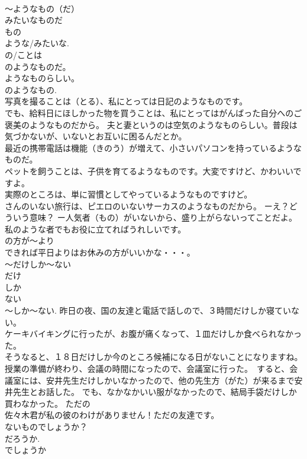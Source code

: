 \documentclass[8pt]{extreport}
\begin{document}
\begin{CJK}{UTF8}{min}
\\	～ようなもの（だ）	
\\	みたいなものだ 
\\	もの 
\\	ような/みたいな. 
\\	の/ことは
\\	のようなものだ。 
\\	ようなものらしい。 
\\	のようなもの. 
\\	写真を撮ることは（とる）、私にとっては日記のようなものです。 
\\	でも、給料日にほしかった物を買うことは、私にとってはがんばった自分へのご褒美のようなものだから。 夫と妻というのは空気のようなものらしい。普段は気づかないが、いないとお互いに困るんだとか。 
\\	最近の携帯電話は機能（きのう）が増えて、小さいパソコンを持っているようなものだ。 
\\	ペットを飼うことは、子供を育てるようなものです。大変ですけど、かわいいですよ。 
\\	実際のところは、単に習慣としてやっているようなものですけど。 
\\	さんのいない旅行は、ピエロのいないサーカスのようなものだから。 ーえ？どういう意味？ ー人気者（もの）がいないから、盛り上がらないってことだよ。 私のような者でもお役に立てればうれしいです。 
\\	の方が～より	
\\	できれば平日よりはお休みの方がいいかな・・・。 
\\	～だけしか～ない	
\\	だけ
\\	しか~
\\	ない 
\\	～しか～ない. 昨日の夜、国の友達と電話で話しので、３時間だけしか寝ていない。 
\\	ケーキバイキングに行ったが、お腹が痛くなって、１皿だけしか食べられなかった。 
\\	そうなると、１８日だけしか今のところ候補になる日がないことになりますね。 
\\	授業の準備が終わり、会議の時間になったので、会議室に行った。　すると、会議室には、安井先生だけしかいなかったので、他の先生方（がた）が来るまで安井先生とお話した。 でも、なかなかいい服がなかったので、結局手袋だけしか買わなかった。 ただの
\\	佐々木君が私の彼のわけがありません！ただの友達です。 
\\	ないものでしょうか？	
\\	だろうか. 
\\	でしょうか 

\end{CJK}
\end{document}
